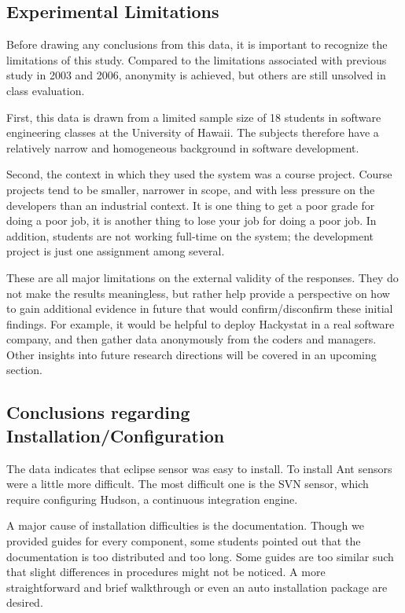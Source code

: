 \documentclass[11pt]{article}
\begin{document}
\subsection {Experimental Limitations}

Before drawing any conclusions from this data, it is important to recognize the limitations of this study. Compared to the limitations associated with previous study in 2003 and 2006, anonymity is achieved, but others are still unsolved in class evaluation.

First, this data is drawn from a limited sample size of 18 students in software engineering classes at the University of Hawaii. The subjects therefore have a relatively narrow and homogeneous background in software development.

Second, the context in which they used the system was a course project.  Course projects tend to be smaller, narrower in scope, and with less pressure on the developers than an industrial context.  It is one thing to get a poor grade for doing a poor job, it is another thing to lose your job for doing a poor job.  In addition, students are not working full-time on the system; the development project is just one assignment among several.  

These are all major limitations on the external validity of the responses.  They do not make the results meaningless, but rather help provide a perspective on how to gain additional evidence in future that would confirm/disconfirm these initial findings.  For example, it would be helpful to deploy Hackystat in a real software company, and then gather data anonymously from the coders and managers. Other insights into future research directions will be covered in an upcoming section.

\subsection {Conclusions regarding Installation/Configuration}
The data indicates that eclipse sensor was easy to install. To install Ant sensors were a little more difficult. The most difficult one is the SVN sensor, which require configuring Hudson, a continuous integration engine. 

A major cause of installation difficulties is the documentation. Though we provided guides for every component, some students pointed out that the documentation is too distributed and too long. Some guides are too similar such that slight differences in procedures might not be noticed. A more straightforward and brief walkthrough or even an auto installation package are desired.
\end{document}
